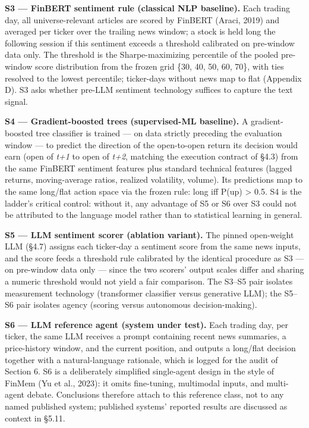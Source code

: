 \documentclass[
  12pt,
]{article}
\begin{document}
\textbf{S3 --- FinBERT sentiment rule (classical NLP baseline).} Each
trading day, all universe-relevant articles are scored by FinBERT
(Araci, 2019) and averaged per ticker over the trailing news window; a
stock is held long the following session if this sentiment exceeds a
threshold calibrated on pre-window data only. The threshold is the
Sharpe-maximizing percentile of the pooled pre-window score distribution
from the frozen grid \{30, 40, 50, 60, 70\}, with ties resolved to the
lowest percentile; ticker-days without news map to flat (Appendix D). S3
asks whether pre-LLM sentiment technology suffices to capture the text
signal.

\textbf{S4 --- Gradient-boosted trees (supervised-ML baseline).} A
gradient-boosted tree classifier is trained --- on data strictly
preceding the evaluation window --- to predict the direction of the
open-to-open return its decision would earn (open of \emph{t+1} to open
of \emph{t+2}, matching the execution contract of §4.3) from the same
FinBERT sentiment features plus standard technical features (lagged
returns, moving-average ratios, realized volatility, volume). Its
predictions map to the same long/flat action space via the frozen rule:
long iff P(up) \textgreater{} 0.5. S4 is the ladder's critical control:
without it, any advantage of S5 or S6 over S3 could not be attributed to
the language model rather than to statistical learning in general.

\textbf{S5 --- LLM sentiment scorer (ablation variant).} The pinned
open-weight LLM (§4.7) assigns each ticker-day a sentiment score from
the same news inputs, and the score feeds a threshold rule calibrated by
the identical procedure as S3 --- on pre-window data only --- since the
two scorers' output scales differ and sharing a numeric threshold would
not yield a fair comparison. The S3--S5 pair isolates measurement
technology (transformer classifier versus generative LLM); the S5--S6
pair isolates agency (scoring versus autonomous decision-making).

\textbf{S6 --- LLM reference agent (system under test).} Each trading
day, per ticker, the same LLM receives a prompt containing recent news
summaries, a price-history window, and the current position, and outputs
a long/flat decision together with a natural-language rationale, which
is logged for the audit of Section 6. S6 is a deliberately simplified
single-agent design in the style of FinMem (Yu et al., 2023): it omits
fine-tuning, multimodal inputs, and multi-agent debate. Conclusions
therefore attach to this reference class, not to any named published
system; published systems' reported results are discussed as context in
§5.11.
\end{document}
